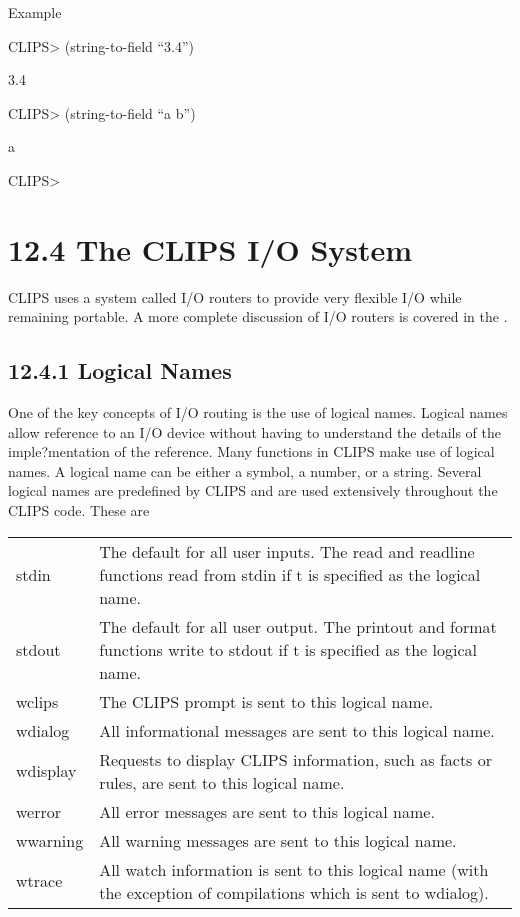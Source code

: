 \documentclass[letterpaper,10pt,english]{sphinxmanual}
\begin{document}
Example

CLIPS\textgreater{} (string-to-field “3.4”)

3.4

CLIPS\textgreater{} (string-to-field “a b”)

a

CLIPS\textgreater{}


\section{12.4 The CLIPS I/O System}
\label{\detokenize{actions:the-clips-i-o-system}}
CLIPS uses a system called I/O routers to provide very flexible I/O
while remaining portable. A more complete discussion of I/O routers is
covered in the .


\subsection{12.4.1 Logical Names}
\label{\detokenize{actions:logical-names}}
One of the key concepts of I/O routing is the use of logical names.
Logical names allow reference to an I/O device without having to
understand the details of the imple?mentation of the reference. Many
functions in CLIPS make use of logical names. A logical name can be
either a symbol, a number, or a string. Several logical names are
predefined by CLIPS and are used extensively throughout the CLIPS code.
These are


\begin{savenotes}\sphinxattablestart
\centering
\begin{tabulary}{\linewidth}[t]{|T|T|}
\hline
\sphinxstyletheadfamily 
{}
&\sphinxstyletheadfamily 
{}
\\
\hline
stdin
&
The default for all user inputs. The read and readline functions read from stdin if t is specified as the logical name.
\\
\hline
stdout
&
The default for all user output. The printout and format functions write to stdout if t is specified as the logical name.
\\
\hline
wclips
&
The CLIPS prompt is sent to this logical name.
\\
\hline
wdialog
&
All informational messages are sent to this logical name.
\\
\hline
wdisplay
&
Requests to display CLIPS information, such as facts or rules, are sent to this logical name.
\\
\hline
werror
&
All error messages are sent to this logical name.
\\
\hline
wwarning
&
All warning messages are sent to this logical name.
\\
\hline
wtrace
&
All watch information is sent to this logical name (with the exception of compilations which is sent to wdialog).
\\
\hline
\end{tabulary}
\par
\sphinxattableend\end{savenotes}
\end{document}
